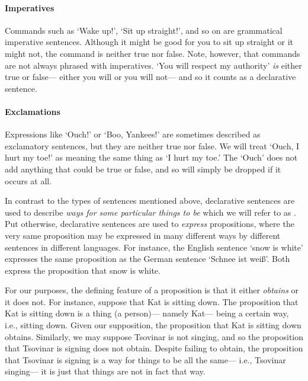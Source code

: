 \paragraph{Imperatives} Commands such as `Wake up!', `Sit up straight!', and so on are grammatical imperative sentences.
Although it might be good for you to sit up straight or it might not, the command is neither true nor false.
Note, however, that commands are not always phrased with imperatives.
`You will respect my authority' \emph{is} either true or false--- either you will or you will not--- and so it counts as a declarative sentence.

\paragraph{Exclamations} Expressions like `Ouch!' or `Boo, Yankees!' are sometimes described as exclamatory sentences, but they are neither true nor false.
We will treat `Ouch, I hurt my toe!' as meaning the same thing as `I hurt my toe.'
The `Ouch' does not add anything that could be true or false, and so will simply be dropped if it occurs at all.


In contrast to the types of sentences mentioned above, declarative sentences are used to describe \textit{ways for some particular things to be} which we will refer to as .
Put otherwise, declarative sentences are used to \textit{express} propositions, where the very same proposition may be expressed in many different ways by different sentences in different languages.
For instance, the English sentence `snow is white' expresses the same proposition as the German sentence `Schnee ist wei\ss'.
Both express the proposition that snow is white.

For our purposes, the defining feature of a proposition is that it either \textit{obtains} or it does not.
For instance, suppose that Kat is sitting down.
The proposition that Kat is sitting down is a thing (a person)--- namely Kat--- being a certain way, i.e., sitting down.
Given our supposition, the proposition that Kat is sitting down obtains.
Similarly, we may suppose Tsovinar is not singing, and so the proposition that Tsovinar is signing does not obtain.
Despite failing to obtain, the proposition that Tsovinar is signing is a way for things to be all the same--- i.e., Tsovinar singing--- it is just that things are not in fact that way.

